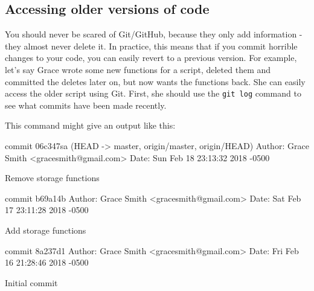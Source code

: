\documentclass[
]{book}
\newenvironment{Shaded}{\begin{snugshade}}{\end{snugshade}}
\newcommand{\DecValTok}[1]{\textcolor[rgb]{0.00,0.00,0.81}{#1}}
\newcommand{\NormalTok}[1]{#1}
\newcommand{\OtherTok}[1]{\textcolor[rgb]{0.56,0.35,0.01}{#1}}
\newcommand{\SpecialCharTok}[1]{\textcolor[rgb]{0.00,0.00,0.00}{#1}}
\begin{document}
\hypertarget{accessing-older-versions-of-code}{%
\subsection{Accessing older versions of code}\label{accessing-older-versions-of-code}}

You should never be scared of Git/GitHub, because they only add information - they almost never delete it. In practice, this means that if you commit horrible changes to your code, you can easily revert to a previous version. For example, let's say Grace wrote some new functions for a script, deleted them and committed the deletes later on, but now wants the functions back. She can easily access the older script using Git. First, she should use the \texttt{git\ log} command to see what commits have been made recently.

\begin{Shaded}
\end{Shaded}

This command might give an output like this:

\begin{Shaded}
\begin{Highlighting}[]
\NormalTok{commit 06c347sa (HEAD }\OtherTok{{-}\textgreater{}}\NormalTok{ master, origin}\SpecialCharTok{/}\NormalTok{master, origin}\SpecialCharTok{/}\NormalTok{HEAD)}
\NormalTok{Author}\SpecialCharTok{:}\NormalTok{ Grace Smith }\SpecialCharTok{\textless{}}\NormalTok{gracesmith}\SpecialCharTok{@}\NormalTok{gmail.com}\SpecialCharTok{\textgreater{}}
\NormalTok{Date}\SpecialCharTok{:}\NormalTok{   Sun Feb }\DecValTok{18} \DecValTok{23}\SpecialCharTok{:}\DecValTok{13}\SpecialCharTok{:}\DecValTok{32} \DecValTok{2018} \SpecialCharTok{{-}}\DecValTok{0500}

\NormalTok{    Remove storage functions}

\NormalTok{commit b69a14b}
\NormalTok{Author}\SpecialCharTok{:}\NormalTok{ Grace Smith }\SpecialCharTok{\textless{}}\NormalTok{gracesmith}\SpecialCharTok{@}\NormalTok{gmail.com}\SpecialCharTok{\textgreater{}}
\NormalTok{Date}\SpecialCharTok{:}\NormalTok{   Sat Feb }\DecValTok{17} \DecValTok{23}\SpecialCharTok{:}\DecValTok{11}\SpecialCharTok{:}\DecValTok{28} \DecValTok{2018} \SpecialCharTok{{-}}\DecValTok{0500}

\NormalTok{    Add storage functions}

\NormalTok{commit 8a237d1}
\NormalTok{Author}\SpecialCharTok{:}\NormalTok{ Grace Smith }\SpecialCharTok{\textless{}}\NormalTok{gracesmith}\SpecialCharTok{@}\NormalTok{gmail.com}\SpecialCharTok{\textgreater{}}
\NormalTok{Date}\SpecialCharTok{:}\NormalTok{   Fri Feb }\DecValTok{16} \DecValTok{21}\SpecialCharTok{:}\DecValTok{28}\SpecialCharTok{:}\DecValTok{46} \DecValTok{2018} \SpecialCharTok{{-}}\DecValTok{0500}

\NormalTok{    Initial commit}
\end{Highlighting}
\end{Shaded}
\end{document}
